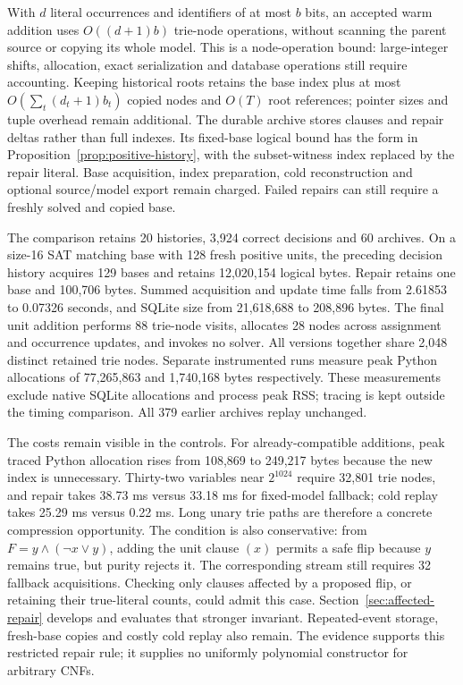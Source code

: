 \documentclass[11pt,a4paper]{article}
\numberwithin{equation}{section}
\theoremstyle{plain}
\theoremstyle{definition}
\theoremstyle{remark}
\begin{document}
With $d$ literal occurrences and identifiers of at most $b$ bits, an accepted warm addition uses $O((d+1)b)$ trie-node operations, without scanning the parent source or copying its whole model. This is a node-operation bound: large-integer shifts, allocation, exact serialization and database operations still require accounting. Keeping historical roots retains the base index plus at most $O(\sum_t(d_t+1)b_t)$ copied nodes and $O(T)$ root references; pointer sizes and tuple overhead remain additional. The durable archive stores clauses and repair deltas rather than full indexes. Its fixed-base logical bound has the form in Proposition~\ref{prop:positive-history}, with the subset-witness index replaced by the repair literal. Base acquisition, index preparation, cold reconstruction and optional source/model export remain charged. Failed repairs can still require a freshly solved and copied base.

The comparison retains 20 histories, 3,924 correct decisions and 60 archives. On a size-16 SAT matching base with 128 fresh positive units, the preceding decision history acquires 129 bases and retains 12,020,154 logical bytes. Repair retains one base and 100,706 bytes. Summed acquisition and update time falls from 2.61853 to 0.07326 seconds, and SQLite size from 21,618,688 to 208,896 bytes. The final unit addition performs 88 trie-node visits, allocates 28 nodes across assignment and occurrence updates, and invokes no solver. All versions together share 2,048 distinct retained trie nodes. Separate instrumented runs measure peak Python allocations of 77,265,863 and 1,740,168 bytes respectively. These measurements exclude native SQLite allocations and process peak RSS; tracing is kept outside the timing comparison. All 379 earlier archives replay unchanged.

The costs remain visible in the controls. For already-compatible additions, peak traced Python allocation rises from 108,869 to 249,217 bytes because the new index is unnecessary. Thirty-two variables near $2^{1024}$ require 32,801 trie nodes, and repair takes 38.73 ms versus 33.18 ms for fixed-model fallback; cold replay takes 25.29 ms versus 0.22 ms. Long unary trie paths are therefore a concrete compression opportunity. The condition is also conservative: from $F=y\land(\neg x\lor y)$, adding the unit clause $(x)$ permits a safe flip because $y$ remains true, but purity rejects it. The corresponding stream still requires 32 fallback acquisitions. Checking only clauses affected by a proposed flip, or retaining their true-literal counts, could admit this case. Section~\ref{sec:affected-repair} develops and evaluates that stronger invariant. Repeated-event storage, fresh-base copies and costly cold replay also remain. The evidence supports this restricted repair rule; it supplies no uniformly polynomial constructor for arbitrary CNFs.
\end{document}
